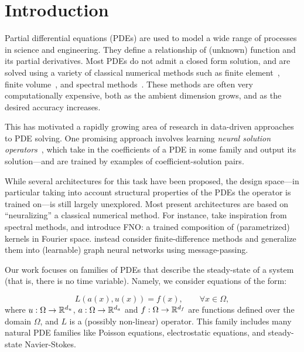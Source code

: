 \section{Introduction}
Partial differential equations (PDEs) 
are used to model a wide range of processes in science and engineering.
They define a relationship of (unknown) function and its partial derivatives. %
Most PDEs do not admit a closed form solution, and are solved using
a variety of classical numerical methods
such as finite element~\citep{leveque2007finite},
finite volume~\citep{moukalled2016finite}, and spectral methods~\citep{kopriva2009implementing, boyd2001chebyshev}. These methods are often very computationally expensive, both as the ambient dimension grows, and as the desired accuracy increases.  




This has motivated a rapidly growing area of research in data-driven approaches to PDE solving. One promising approach involves  learning \emph{neural solution operators}~\citep{chen1995universal, lu2019deeponet, bhattacharya2021model, li2020neural}, which take in the coefficients of a PDE in some family and output its solution---and are trained by examples of coefficient-solution pairs.  

While several architectures for this task have been proposed, the design space---in particular taking into account structural properties of the PDEs the operator is trained on---is still largely unexplored. Most present architectures are based on ``neuralizing'' a classical numerical method. For instance, \cite{li2020fourier} take inspiration from spectral methods, and introduce FNO: a trained composition of (parametrized) kernels in Fourier space. \cite{brandstetter2022message} instead consider 
finite-difference methods and generalize them into (learnable) graph neural networks using message-passing.  

Our work focuses on families of PDEs that describe the steady-state of a system (that is, there is no time variable). Namely, we consider equations of the form: %


\begin{equation}
    \label{eq:lu_f}
    L(a(x), u(x)) = f(x), \qquad \forall x \in \Omega,
\end{equation}
where $u:\Omega \to \mathbb{R}^{d_u}$, 
$a: \Omega \to \mathbb{R}^{d_a}$ 
and $f: \Omega \to \mathbb{R}^{d_f}$ are functions defined over the domain $\Omega$, 
and $L$ is a (possibly non-linear) operator. 
This family includes many natural PDE families like Poisson equations, electrostatic equations, and steady-state Navier-Stokes.

